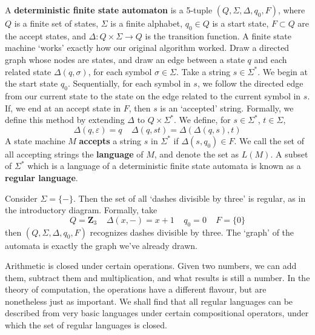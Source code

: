 A {\bf deterministic finite state automaton} is a 5-tuple $(Q, \Sigma, \Delta, q_0, F)$, where $Q$ is a finite set of states, $\Sigma$ is a finite alphabet, $q_0 \in Q$ is a start state, $F \subset Q$ are the accept states, and $\Delta: Q \times \Sigma \to Q$ is the transition function. A finite state machine `works' exactly how our original algorithm worked. Draw a directed graph whose nodes are states, and draw an edge between a state $q$ and each related state $\Delta(q, \sigma)$, for each symbol $\sigma \in \Sigma$. Take a string $s \in \Sigma^*$. We begin at the start state $q_0$. Sequentially, for each symbol in $s$, we follow the directed edge from our current state to the state on the edge related to the current symbol in $s$. If, we end at an accept state in $F$, then $s$ is an `accepted' string. Formally, we define this method by extending $\Delta$ to $Q \times \Sigma^*$. We define, for $s \in \Sigma^*$, $t \in \Sigma$,
%
\[ \Delta(q, \varepsilon) = q\ \ \ \ \ \Delta(q, st) = \Delta(\Delta(q,s), t) \]
%
A state machine $M$ {\bf accepts} a string $s$ in $\Sigma^*$ if $\Delta(s,q_0) \in F$. We call the set of all accepting strings the {\bf language} of $M$, and denote the set as $L(M)$. A subset of $\Sigma^*$ which is a language of a deterministic finite state automata is known as a {\bf regular language}.

\begin{example}
    Consider $\Sigma = \{ - \}$. Then the set of all `dashes divisible by three' is regular, as in the introductory diagram. Formally, take
    \[ Q = \mathbf{Z}_3\ \ \ \ \ \Delta(x,-) = x+1\ \ \ \ \ q_0 = 0\ \ \ \ \ F = \{ 0 \} \]
    then $(Q, \Sigma, \Delta, q_0, F)$ recognizes dashes divisible by three. The `graph' of the automata is exactly the graph we've already drawn.
\end{example}

Arithmetic is closed under certain operations. Given two numbers, we can add them, subtract them and multiplication, and what results is still a number. In the theory of computation, the operations have a different flavour, but are nonetheless just as important. We shall find that all regular languages can be described from very basic languages under certain compositional operators, under which the set of regular languages is closed.

